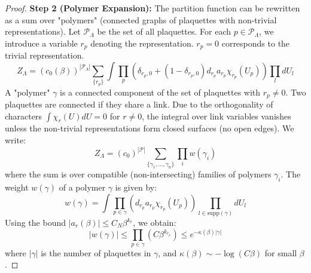 \begin{proof}
\textbf{Step 2 (Polymer Expansion):}
The partition function can be rewritten as a sum over "polymers" (connected graphs of plaquettes with non-trivial representations).
Let $\mathcal{P}_\Lambda$ be the set of all plaquettes. For each $p \in \mathcal{P}_\Lambda$, we introduce a variable $r_p$ denoting the representation. $r_p=0$ corresponds to the trivial representation.
\begin{equation}
Z_\Lambda = (c_0(\beta))^{|\mathcal{P}_\Lambda|} \sum_{\{r_p\}} \int \prod_{p} \left( \delta_{r_p,0} + (1-\delta_{r_p,0}) d_{r_p} a_{r_p} \chi_{r_p}(U_p) \right) \prod_{l} dU_l
\end{equation}
A "polymer" $\gamma$ is a connected component of the set of plaquettes with $r_p \neq 0$. Two plaquettes are connected if they share a link.
Due to the orthogonality of characters $\int \chi_r(U) dU = 0$ for $r \neq 0$, the integral over link variables vanishes unless the non-trivial representations form closed surfaces (no open edges).
We write:
\begin{equation}
Z_\Lambda = (c_0)^{|\mathcal{P}|} \sum_{\{\gamma_1, \dots, \gamma_n\}} \prod_i w(\gamma_i)
\end{equation}
where the sum is over compatible (non-intersecting) families of polymers $\gamma_i$. The weight $w(\gamma)$ of a polymer $\gamma$ is given by:
\begin{equation}
w(\gamma) = \int \prod_{p \in \gamma} (d_{r_p} a_{r_p} \chi_{r_p}(U_p)) \prod_{l \in \text{supp}(\gamma)} dU_l
\end{equation}
Using the bound $|a_r(\beta)| \leq C_N \beta^{k_r}$, we obtain:
\begin{equation}
|w(\gamma)| \leq \prod_{p \in \gamma} (C \beta^{k_{r_p}}) \leq e^{- \kappa(\beta) |\gamma|}
\end{equation}
where $|\gamma|$ is the number of plaquettes in $\gamma$, and $\kappa(\beta) \sim -\log(C\beta)$ for small $\beta$.


\end{proof}
